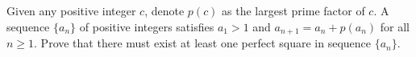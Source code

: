 Given any positive integer $c$, denote $p(c)$ as the largest prime factor of $c$. A sequence $\{a_n\}$  of positive integers satisfies $a_1>1$ and $a_{n+1}=a_n+p(a_n)$ for all $n\ge 1$. Prove that there must exist at least one perfect square in sequence $\{a_n\}$.